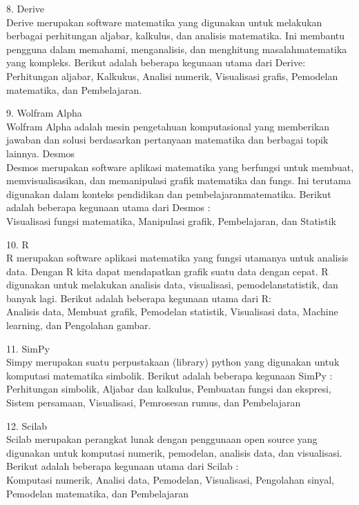 \documentclass[a4paper,10pt]{article}
\begin{document}
\begin{eulernotebook}
\begin{eulercomment}
8. Derive\\
Derive merupakan software matematika yang digunakan untuk melakukan berbagai
perhitungan aljabar, kalkulus, dan analisis matematika. Ini membantu pengguna
dalam memahami, menganalisis, dan menghitung masalahmatematika yang kompleks.
Berikut adalah beberapa kegunaan utama dari Derive:\\
Perhitungan aljabar, Kalkukus, Analisi numerik, Visualisasi grafis, Pemodelan
matematika, dan Pembelajaran.

9. Wolfram Alpha\\
Wolfram Alpha adalah mesin pengetahuan komputasional yang memberikan jawaban
dan solusi berdasarkan pertanyaan matematika dan berbagai topik lainnya.
Desmos\\
Desmos merupakan software aplikasi matematika yang berfungsi untuk membuat,
memvisualisasikan, dan memanipulasi grafik matematika dan fungs. Ini terutama
digunakan dalam konteks pendidikan dan pembelajaranmatematika. Berikut adalah
beberapa kegunaan utama dari Desmos :\\
Visualisasi fungsi matematika, Manipulasi grafik, Pembelajaran, dan Statistik

10. R\\
R merupakan software aplikasi matematika yang fungsi utamanya untuk analisis
data. Dengan R kita dapat mendapatkan grafik suatu data dengan cepat. R
digunakan untuk melakukan analisis data, visualisasi, pemodelanstatistik, dan
banyak lagi. Berikut adalah beberapa kegunaan utama dari R:\\
Analisis data, Membuat grafik, Pemodelan statistik, Visualisasi data, Machine
learning, dan Pengolahan gambar.

11. SimPy\\
Simpy merupakan suatu perpustakaan (library) python yang digunakan untuk
komputasi matematika simbolik. Berikut adalah beberapa kegunaan SimPy :\\
Perhitungan simbolik, Aljabar dan kalkulus, Pembuatan fungsi dan ekspresi,
Sistem persamaan, Visualisasi, Pemrosesan rumus, dan Pembelajaran

12. Scilab\\
Scilab merupakan perangkat lunak dengan penggunaan open source yang digunakan
untuk komputasi numerik, pemodelan, analisis data, dan visualisasi. Berikut
adalah beberapa kegunaan utama dari Scilab :\\
Komputasi numerik, Analisi data, Pemodelan, Visualisasi, Pengolahan sinyal,
Pemodelan matematika, dan Pembelajaran


\end{eulercomment}
\end{eulernotebook}
\end{document}
